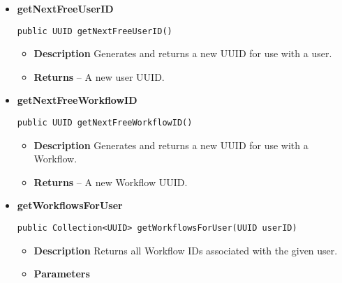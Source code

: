 \documentclass[11pt,a4paper]{report}
\begin{document}
{{{{{{{{{{\begin{itemize}
{\begin{itemize}
{							}%
						\end{itemize}
					}%
					\item{ 
						\hypertarget{studyplanning.model.DataIO.getNextFreeUserID()}{{\bf  getNextFreeUserID}\\}
						\begin{lstlisting}[frame=none]
public UUID getNextFreeUserID()
						\end{lstlisting} %
						\begin{itemize}
							\item{
								{\bf  Description}
								Generates and returns a new UUID for use with a user.
							}
							\item{
								{\bf  Returns} 
								-- A new user UUID. 
							}%
						\end{itemize}
					}%
					\item{ 
						\hypertarget{studyplanning.model.DataIO.getNextFreeWorkflowID()}{{\bf  getNextFreeWorkflowID}\\}
						\begin{lstlisting}[frame=none]
public UUID getNextFreeWorkflowID()
						\end{lstlisting} %
						\begin{itemize}
							\item{
								{\bf  Description}
								Generates and returns a new UUID for use with a Workflow.
							}
							\item{
								{\bf  Returns} 
								-- A new Workflow UUID. 
							}%
						\end{itemize}
					}%
					\item{ 
						\hypertarget{studyplanning.model.DataIO.getWorkflowsForUser(java.util.UUID)}{{\bf  getWorkflowsForUser}\\}
						\begin{lstlisting}[frame=none]
public Collection<UUID> getWorkflowsForUser(UUID userID)
						\end{lstlisting} %
						\begin{itemize}
							\item{
								{\bf  Description}
								Returns all Workflow IDs associated with the given user.
							}
							\item{
								{\bf  Parameters}
								\begin{itemize}

\end{itemize}}
\end{itemize}}
\end{itemize}}}}}}}}}}}
\end{document}
